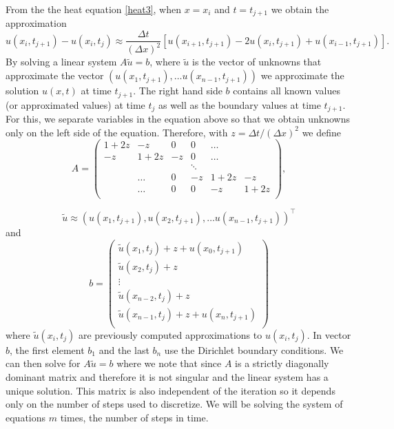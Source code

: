 \documentclass[00main.tex]{subfiles}
\begin{document}
From the the heat equation \eqref{heat3}, when $x=x_i$ and $t=t_{j+1}$ we obtain the approximation \[ u (x_i, t_{j+1}) - u(x_i, t_j) \approx  \frac{\Delta t}{(\Delta x)^2} \left[ u(x_{i+1}, t_{j+1}) - 2u (x_{i}, t_{j+1}) + u (x_{i-1}, t_{j+1}) \right]. \] %
By solving a linear system $A\tilde{u} = b$, where $\tilde{u}$ is the vector of unknowns that approximate the vector $(u(x_1,t_{j+1}), \hdots u(x_{n-1},t_{j+1}))$ we approximate the solution $u(x,t)$ at time $t_{j+1}$. The right hand side $b$ contains all known values (or approximated values) at time $t_j$ as well as the boundary values at time $t_{j+1}$. For this, we separate variables in the equation above so that we obtain unknowns only on the left side of the equation. 
Therefore, with $z = \Delta t/ (\Delta x)^2$ we define \[ A = \left( \begin{array}{cccccc}
1+2z & -z & 0 & 0 & \hdots & \\
-z & 1+2z & -z & 0 & \hdots & \\
 & & & \ddots & & \\
  & \hdots & 0 & -z & 1+2z & -z\\
 & \hdots & 0 & 0 & -z & 1+2z\\
\end{array} \right), \]

\[ \tilde{u} \approx \left( u(x_{1}, t_{j+1}), u(x_{2}, t_{j+1}), \hdots  u(x_{n-1}, t_{j+1}) \right)^\top \] and \[ b = \left( \begin{array}{c}
\tilde{u}(x_1,t_j) + z + u(x_0, t_{j+1})\\
\tilde{u}(x_2,t_j) + z\\ \vdots \\ 
\tilde{u}(x_{n-2},t_j) + z\\
\tilde{u}(x_{n-1},t_j) + z + u(x_n, t_{j+1})\\
\end{array}  \right) \] where $\tilde{u} (x_i,t_j)$ are previously computed approximations to $u(x_i,t_j)$. In vector $b$, the first element $b_1$ and the last $b_n$ use the Dirichlet boundary conditions. We can then solve for $A\tilde{u}=b$ where we note that since $A$ is a strictly diagonally dominant matrix and therefore it is not singular and the linear system has a unique solution. This matrix is also independent of the iteration so it depends only on the number of steps used to discretize. We will be solving the system of equations $m$ times, the number of steps in time.
\end{document}
